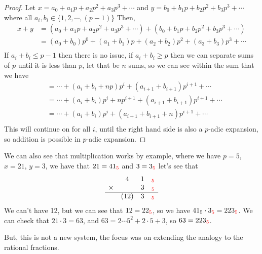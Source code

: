 \documentclass[11pt]{article}
\newcommand*\inb[1]{_{\textcolor{red}{#1}}}
\newcommand{\padic}{$p$-adic }
\begin{document}
\begin{proof}
  Let $x=a_0+a_1p+a_2p^2 +a_3p^3 + \cdots$ and $y=b_0+b_1p+b_2p^2 +b_3p^3 + \cdots$ where all $a_i,b_i\in \{1,2,\cdots, (p-1)\}$
  Then,
  \begin{align*}
    x + y & = (a_0+a_1p+a_2p^2 +a_3p^3 + \cdots)+ (b_0+b_1p+b_2p^2 +b_3p^3 + \cdots) \\
          & = (a_0+b_0)p^0 +(a_1+b_1)p+(a_2+b_2)p^2 +(a_3+b_3)p^3 + \cdots           \\
  \end{align*}
  If $a_i+b_i\leq p-1$ then there is no issue, if $a_i+b_i\geq p$ then we can separate sums of $p$ until it is less than $p$, let that be $n$ sums, so we can see within the sum that we have
  \begin{align*}
     & = \cdots + (a_i+b_i+np)p^i + (a_{i+1}+b_{i+1})p^{i+1} + \cdots         \\
     & = \cdots + (a_i+b_i)p^i + np^{i+1} + (a_{i+1}+b_{i+1})p^{i+1} + \cdots \\
     & = \cdots + (a_i+b_i)p^i + (a_{i+1}+b_{i+1}+n)p^{i+1} + \cdots          \\
  \end{align*}
  This will continue on for all $i$, until the right hand side is also a \padic expansion, so addition is possible in \padic expansion.
\end{proof}

We can also see that multiplication works by example, where we have $p=5$, $x=21$, $y=3$, we have that $21=41\inb{5}$ and $3=3\inb{5}$ let's see that
\[
  \begin{matrix}
    ~      & 4    & 1 & \inb{5} \\
    \times & ~    & 3 & \inb{5} \\
    \hline
    ~      & (12) & 3 & \inb{5} \\
  \end{matrix}
\]
We can't have 12, but we can see that $12=22\inb{5}$, so we have $41_5\cdot 3\inb{5} = 223\inb{5}$. We can check that $21\cdot3= 63$, and $63=2\cdots 5^2 + 2\cdot 5 + 3$, so $63=223\inb{5}$.




But, this is not a new system, the focus was on extending the analogy to the rational fractions.
\end{document}
